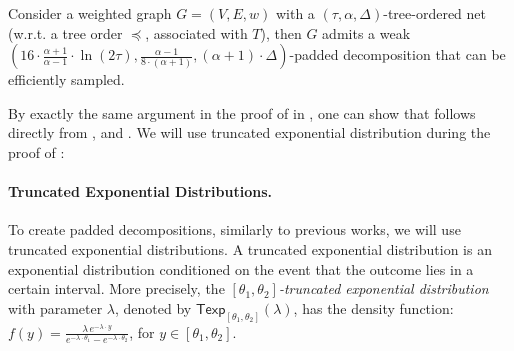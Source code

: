 \documentclass{theoretics}
\newcommand{\Texp}{\mathsf{Texp}}
\begin{document}
\begin{lemma}\label{lem:NetToPadded}
	Consider a weighted graph $G=(V,E,w)$ with a $(\tau,\alpha,\Delta)$-tree-ordered net (w.r.t. a tree order $\preceq$, associated with $T$), then $G$ admits a weak $\left(16\cdot\frac{\alpha+1}{\alpha-1}\cdot\ln(2\tau),\frac{\alpha-1}{8\cdot(\alpha+1)},(\alpha+1)\cdot\Delta\right)$-padded decomposition that can be efficiently sampled.
\end{lemma}



By exactly the same argument in the proof of  in , one can show that    follows directly from ,  and . We will use truncated exponential distribution during the proof of :

\paragraph*{Truncated Exponential Distributions.} To create padded decompositions, similarly to previous works, we will use truncated exponential distributions. A truncated exponential distribution is an exponential distribution conditioned on the event that the outcome lies in a certain interval. More precisely, the \emph{$[\theta_1,\theta_2]$-truncated exponential distribution} with
parameter $\lambda$, denoted by $\Texp_{[\theta_1, \theta_2]}(\lambda)$, has
the density function:
$f(y)= \frac{ \lambda\, e^{-\lambda\cdot y} }{e^{-\lambda \cdot \theta_1} - e^{-\lambda
		\cdot \theta_2}}$, for $y \in [\theta_1, \theta_2]$.
\end{document}
